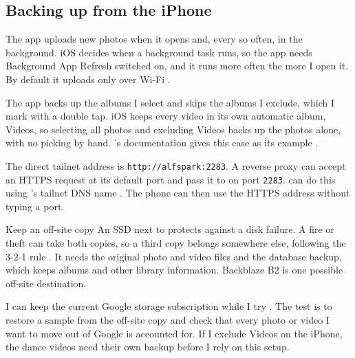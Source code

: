 \documentclass[11pt,a4paper]{article}
\begin{document}
\subsection*{Backing up from the iPhone}

The  app uploads new photos when it opens and, every so often, in the background. iOS decides when a background task runs, so the app needs Background App Refresh switched on, and it runs more often the more I open it. By default it uploads only over Wi-Fi \cite{immichmobile}.

The app backs up the albums I select and skips the albums I exclude, which I mark with a double tap. iOS keeps every video in its own automatic album, Videos, so selecting all photos and excluding Videos backs up the photos alone, with no picking by hand. 's documentation gives this case as its example \cite{immichmobile}.

The direct tailnet address is \texttt{http://alfspark:2283}. A reverse proxy can accept an HTTPS request at its default port and pass it to  on port \texttt{2283}.  can do this using 's tailnet DNS name \cite{tailscaleserve}. The phone can then use the HTTPS address without typing a port.

\begin{insight}{Keep an off-site copy}
An SSD next to  protects against a disk failure. A fire or theft can take both copies, so a third copy belongs somewhere else, following the 3-2-1 rule \cite{immichbackup}. It needs the original photo and video files and the database backup, which keeps albums and other library information. Backblaze B2 is one possible off-site destination.

I can keep the current Google storage subscription while I try . The test is to restore a sample from the off-site copy and check that every photo or video I want to move out of Google is accounted for. If I exclude Videos on the iPhone, the dance videos need their own backup before I rely on this setup.
\end{insight}
\end{document}
